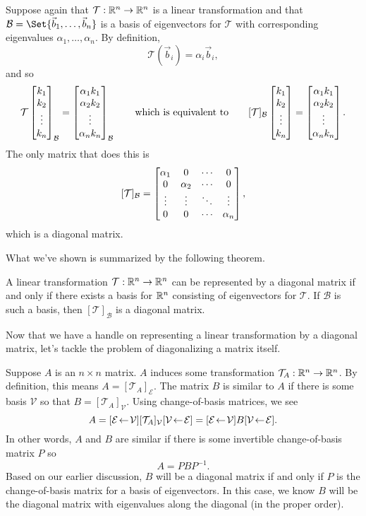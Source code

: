 Suppose again that $\mathcal T:\mathbb{R}^n\to\mathbb{R}^n$ is a linear transformation and that $\mathcal B=\Set{\vec b_1,\ldots,\vec b_n}$
is a basis of eigenvectors for $\mathcal T$ with corresponding eigenvalues $\alpha_1,\ldots,\alpha_n$. By definition,
\[
	\mathcal T(\vec b_i)=\alpha_i\vec b_i,
\]
and so
\[
	\mathcal T\begin{bmatrix}k_1\\k_2\\\vdots\\k_n\end{bmatrix}_{\mathcal B} = \begin{bmatrix}\alpha_1k_1\\\alpha_2k_2\\\vdots\\\alpha_nk_n\end{bmatrix}_{\mathcal B}
	\qquad\text{which is equivalent to}\qquad
	[\mathcal T]_{\mathcal B}\begin{bmatrix}k_1\\k_2\\\vdots\\k_n\end{bmatrix} = \begin{bmatrix}\alpha_1k_1\\\alpha_2k_2\\\vdots\\\alpha_nk_n\end{bmatrix}.
\]
The only matrix that does this is
\[
	[\mathcal T]_{\mathcal B} = \begin{bmatrix}\alpha_1&0&\cdots &0\\0&\alpha_2&\cdots &0\\\vdots&\vdots&\ddots&\vdots\\0&0&\cdots&\alpha_n\end{bmatrix},
\]
which is a diagonal matrix.

What we've shown is summarized by the following theorem.
\begin{theorem}
	A linear transformation $\mathcal T:\mathbb{R}^n\to\mathbb{R}^n$ can be represented by a diagonal matrix if and
	only if there exists a basis for $\mathbb{R}^n$ consisting of eigenvectors for $\mathcal T$. If
	$\mathcal B$ is such a basis, then $[\mathcal T]_{\mathcal B}$ is a diagonal matrix.
\end{theorem}

Now that we have a handle on representing a linear transformation by a diagonal matrix, let's tackle
the problem of diagonalizing a matrix itself.


Suppose $A$ is an $n\times n$ matrix. $A$ induces some transformation $\mathcal T_A:\mathbb{R}^n\to\mathbb{R}^n$. By definition,
this means $A=[\mathcal T_A]_{\mathcal E}$. The matrix $B$ is similar to $A$ if there is some basis $\mathcal V$ so that
$B=[\mathcal T_A]_{\mathcal V}$. Using change-of-basis matrices, we see
\[
	A=\BasisChange{\mathcal V}{\mathcal E}[\mathcal T_A]_{\mathcal V}\BasisChange{\mathcal E}{\mathcal V}
	=\BasisChange{\mathcal V}{\mathcal E}B\BasisChange{\mathcal E}{\mathcal V}.
\]
In other words, $A$ and $B$ are similar if there is some invertible change-of-basis matrix $P$ so
\[
	A=PBP^{-1}.
\]
Based on our earlier discussion, $B$ will be a diagonal matrix if and only if $P$ is the change-of-basis matrix for a
basis of eigenvectors. In this case, we know $B$ will be the diagonal matrix with eigenvalues along the diagonal (in the proper order).

